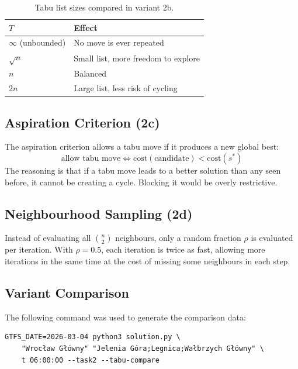 \documentclass[12pt,a4paper]{article}
\begin{document}
\begin{table}[H]
\centering
\begin{tabular}{ll}
\toprule
\textbf{$T$} & \textbf{Effect} \\
\midrule
$\infty$ (unbounded) & No move is ever repeated \\
$\sqrt{n}$           & Small list, more freedom to explore \\
$n$                  & Balanced \\
$2n$                 & Large list, less risk of cycling \\
\bottomrule
\end{tabular}
\caption{Tabu list sizes compared in variant 2b.}
\end{table}

\subsection{Aspiration Criterion (2c)}

The aspiration criterion allows a tabu move if it produces a new global best:
\[
  \text{allow tabu move} \iff \text{cost}(\text{candidate}) < \text{cost}(s^*)
\]
The reasoning is that if a tabu move leads to a better solution than any seen
before, it cannot be creating a cycle. Blocking it would be overly restrictive.

\subsection{Neighbourhood Sampling (2d)}

Instead of evaluating all $\binom{n}{2}$ neighbours, only a random fraction
$\rho$ is evaluated per iteration. With $\rho = 0.5$, each iteration is twice
as fast, allowing more iterations in the same time at the cost of missing some
neighbours in each step.

\subsection{Variant Comparison}

The following command was used to generate the comparison data:

\begin{verbatim}
GTFS_DATE=2026-03-04 python3 solution.py \
    "Wrocław Główny" "Jelenia Góra;Legnica;Wałbrzych Główny" \
    t 06:00:00 --task2 --tabu-compare
\end{verbatim}
\end{document}
